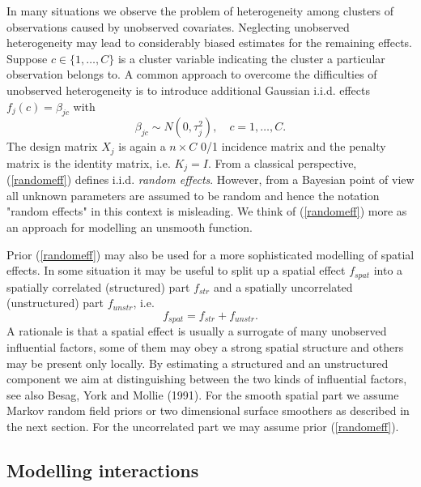 \documentclass[11pt,a4paper,twoside]{bayesxarticle}
\begin{document}
In many situations we observe the problem of heterogeneity among
clusters of observations caused by unobserved covariates.
Neglecting unobserved heterogeneity may lead to considerably
biased estimates for the remaining effects. Suppose $c \in
\{1,\dots,C\}$ is a cluster variable indicating the cluster a
particular observation belongs to. A common approach to overcome
the difficulties of unobserved heterogeneity is to introduce
additional Gaussian i.i.d. effects $f_j(c) = \beta_{jc}$ with
\begin{equation}
\label{randomeff} \beta_{jc} \sim N(0,\tau_j^2), \quad
c=1,\dots,C.
\end{equation}
The design matrix $X_j$ is again a $n \times C$ 0/1 incidence
matrix and the penalty matrix is the identity matrix, i.e.
$K_j=I$. From a classical perspective, (\ref{randomeff}) defines
i.i.d. {\em random effects}. However, from a Bayesian point of
view all unknown parameters are assumed to be random and hence the
notation "random effects" in this context is misleading. We think
of (\ref{randomeff}) more as an approach for modelling an unsmooth
function.

Prior (\ref{randomeff}) may also be used for a more sophisticated
modelling of spatial effects. In some situation it may be useful
to split up a spatial effect $f_{spat}$ into a spatially
correlated (structured) part $f_{str}$ and a spatially
uncorrelated (unstructured) part $f_{unstr}$, i.e.
$$
f_{spat} = f_{str}+f_{unstr}.
$$
A rationale is that a spatial effect is usually a surrogate of
many unobserved influential factors, some of them may obey a
strong spatial structure and others may be present only locally.
By estimating a structured and an unstructured component we aim at
distinguishing between the two kinds of influential factors, see
also Besag, York and Mollie (1991). For the smooth spatial part we
assume Markov random field priors or two dimensional surface
smoothers as described in the next section. For the uncorrelated
part we may assume prior (\ref{randomeff}).

\subsection{Modelling interactions}
\label{interactions}
\end{document}
